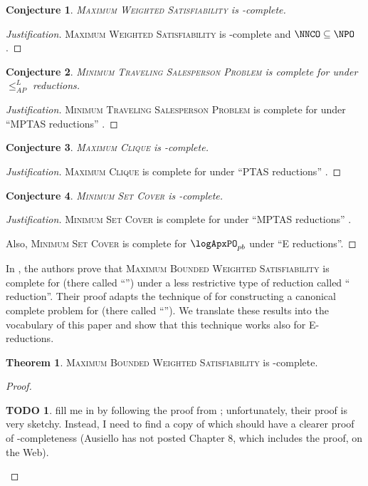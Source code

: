\documentclass[]{article}
\newtheorem{conjecture}{Conjecture}
\theoremstyle{definition} \newtheorem{definition}{Definition}
\theoremstyle{definition} \newtheorem{openquestion}{Open question}
\newtheorem{theorem}{Theorem}
\newtheorem{todo}{TODO}
\newenvironment{justification}{\begin{proof}[Justification]}{\end{proof}}
\newcommand{\APr}{\leq_{AP}^{L}}
\begin{document}
\begin{conjecture}
  \textsc{Maximum Weighted Satisfiability} is \NNCO-complete.
\end{conjecture}
\begin{justification}
  \textsc{Maximum Weighted Satisfiability} is \NPO-complete \cite{ckst95} and $\NNCO\subseteq\NPO$.
\end{justification}

\begin{conjecture}
  \textsc{Minimum Traveling Salesperson Problem} is complete for \expApxNCO{} under $\APr$ reductions.
\end{conjecture}
\begin{justification}
  \textsc{Minimum Traveling Salesperson Problem} is complete for \expApxPO{} under ``MPTAS reductions'' \cite[Corollary~1]{ep06}.
\end{justification}

\begin{conjecture}
  \textsc{Maximum Clique} is \polyApxNCO-complete.
\end{conjecture}
\begin{justification}
  \textsc{Maximum Clique} is complete for \polyApxPO{} under ``PTAS reductions'' \cite[Example~2.48]{cks01} \cite{kmsv99} \cite{ep10}.
\end{justification}

\begin{conjecture}
  \textsc{Minimum Set Cover} is \logApxNCO-complete.
\end{conjecture}
\begin{justification}
  \textsc{Minimum Set Cover} is complete for \logApxPO{} under ``MPTAS reductions'' \cite[Example~2.48]{cks01} \cite[Theorem~5]{ep06} \cite[Theorem~27]{ep10}.

  Also, \textsc{Minimum Set Cover} is complete for $\logApxPO_{pb}$ under ``E reductions''.
\end{justification}

In \cite{sx95}, the authors prove that \textsc{Maximum Bounded Weighted Satisfiability} is complete for \ApxNCO{} (there called ``\NCX'') under a less restrictive type of reduction called ``\NCAS{} reduction''.
Their proof adapts the technique of \cite{cp91} for constructing a canonical complete problem for \ApxPO{} (there called ``\APX'').
We translate these results into the vocabulary of this paper and show that this technique works also for E-reductions.
\begin{theorem}
  \textsc{Maximum Bounded Weighted Satisfiability} is \ApxNCO-complete.
\end{theorem}
\begin{proof}
  \begin{todo}
    fill me in by following the proof from \cite{sx95}; unfortunately, their proof is very sketchy.
    Instead, I need to find a copy of \cite{acgkmp99} which should have a clearer proof of \ApxPO-completeness (Ausiello has not posted Chapter 8, which includes the proof, on the Web).
  \end{todo}
\end{proof}
\end{document}
